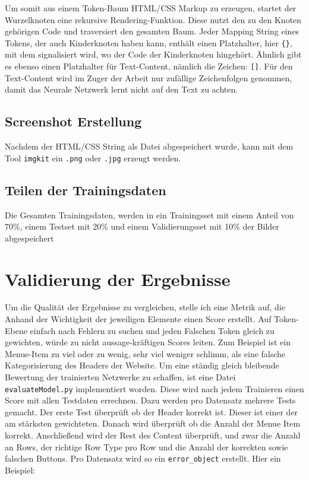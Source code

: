 \documentclass[pdftex,a4paper,halfparskip]{scrartcl}
\begin{document}
Um somit aus einem Token-Baum HTML/CSS Markup zu erzeugen, startet der Wurzelknoten eine rekursive Rendering-Funktion. Diese nutzt den zu den Knoten gehörigen Code und traversiert den gesamten Baum. Jeder Mapping String eines Tokens, der auch Kinderknoten haben kann, enthält einen Platzhalter, hier \texttt{\{\}}, mit dem signalisiert wird, wo der Code der Kinderknoten hingehört. Ähnlich gibt es ebenso einen Platzhalter für Text-Content, nämlich die Zeichen: \texttt{[]}. 
Für den Text-Content wird im Zuger der Arbeit nur zufällige Zeichenfolgen genommen, damit das Neurale Netzwerk lernt nicht auf den Text zu achten. 


\subsection{Screenshot Erstellung}

Nachdem der HTML/CSS String als Datei abgespeichert wurde, kann mit dem Tool \texttt{imgkit} ein \texttt{.png} oder \texttt{.jpg} erzeugt werden.

\subsection{Teilen der Trainingsdaten}

Die Gesamten Trainingsdaten, werden in ein Trainingsset mit einem Anteil von 70\%, einem Testset mit 20\% und einem Validierungsset mit 10\% der Bilder abgespeichert

\section{Validierung der Ergebnisse}
Um die Qualität der Ergebnisse zu vergleichen, stelle ich eine Metrik auf, die Anhand der Wichtigkeit der jeweiligen Elemente einen Score erstellt. Auf Token-Ebene einfach nach Fehlern zu suchen und jeden Falschen Token gleich zu gewichten, würde zu nicht aussage-kräftigen Scores leiten. Zum Beispiel ist ein Menue-Item zu viel oder zu wenig, sehr viel weniger schlimm, als eine falsche Kategorisierung des Headers der Website. Um eine ständig gleich bleibende Bewertung der trainierten Netzwerke zu schaffen, ist eine Datei \texttt{evaluateModel.py} implementiert worden. Diese wird nach jedem Trainieren einen Score mit allen Testdaten errechnen. Dazu werden pro Datensatz mehrere Tests gemacht. Der erste Test überprüft ob der Header korrekt ist. Dieser ist einer der am stärksten gewichteten. Danach wird überprüft ob die Anzahl der Menue Item korrekt. Anschließend wird der Rest des Content überprüft, und zwar die Anzahl an Rows, der richtige Row Type pro Row und die Anzahl der korrekten sowie falschen Buttons. Pro Datensatz wird so ein \texttt{error\_object} erstellt. 
Hier ein Beispiel:
\end{document}
